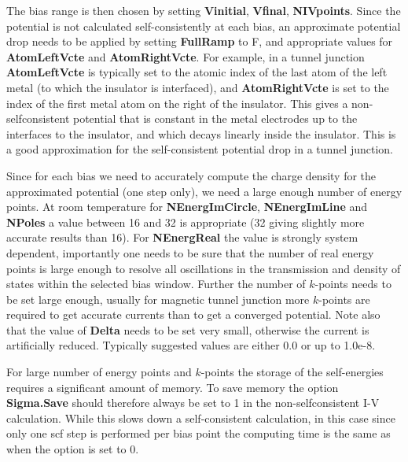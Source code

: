 \documentclass[11pt]{article}
\begin{document}
{The bias range is then chosen by setting {\bf Vinitial}, {\bf Vfinal}, {\bf NIVpoints}. Since the potential is not calculated self-consistently at each bias, an approximate potential drop needs to be applied by setting {\bf FullRamp} to F, and appropriate values for {\bf AtomLeftVcte} and {\bf AtomRightVcte}. For example, in a tunnel junction {\bf AtomLeftVcte} is typically set to the atomic index of the last atom of the left metal (to which the insulator is interfaced), and  {\bf AtomRightVcte} is set to the index of the first metal atom on the right of the insulator. This gives a non-selfconsistent potential that is constant in the metal electrodes up to the interfaces to the insulator, and which decays linearly inside the insulator. This is a good approximation for the self-consistent potential drop in a tunnel junction.

Since for each bias we need to accurately compute the charge density for the approximated potential (one step only), we need a large enough number of energy points. At room temperature for {\bf NEnergImCircle}, {\bf NEnergImLine} and {\bf NPoles} a value between 16 and 32 is appropriate (32 giving slightly more accurate results than 16). For {\bf NEnergReal} the value is strongly system dependent, importantly one needs to be sure that the number of real energy points is large enough to resolve all oscillations in the transmission and density of states within the selected bias window. Further the number of $k$-points needs to be set large enough, usually for magnetic tunnel junction more $k$-points are required to get accurate currents than to get a converged potential. Note also that the value of {\bf Delta} needs to be set very small, otherwise the current is artificially reduced. Typically suggested values are either 0.0 or up to 1.0e-8.

For large number of energy points and $k$-points the storage of the self-energies requires a significant amount of memory. To save memory the option {\bf Sigma.Save} should therefore always be set to 1 in the non-selfconsistent I-V calculation. While this slows down a self-consistent calculation, in this case since only one scf step is performed per bias point the computing time is the same as when the option is set to 0.

}
\end{document}
